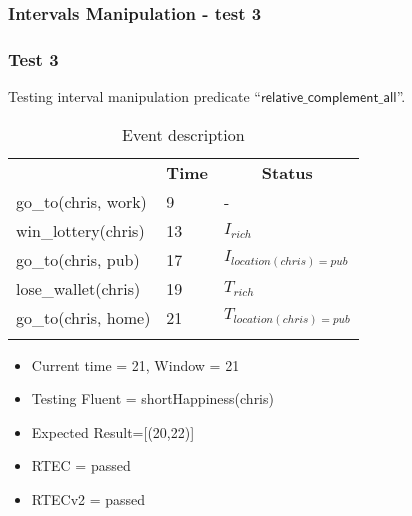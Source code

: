 \documentclass[8pt]{beamer}
\def \patsize {}
\def\complementall{\textsf{\patsize relative\_complement\_all}}
\begin{document}
\begin{frame}
    \frametitle{Intervals Manipulation - test 3}
    \subsubsection{Test 3}
    \small Testing interval manipulation predicate ``$\complementall$''.\linebreak
    \begin{minipage}{0.48\linewidth}
        \begin{table}[t!]
            \caption{Event description}
            \begin{center}

                \begin{tabular}{lll}
                    \hline\noalign{\smallskip}
                    \multicolumn{1}{l}{\textbf{Event}} & \multicolumn{1}{c}{\textbf{Time}} & \multicolumn{1}{c}{\textbf{Status}}   \\
                    go\_to(chris, work)& 9 & -\\
                    win\_lottery(chris)& 13 & $I_{rich}$\\
                    go\_to(chris, pub)& 17 & $I_{location(chris)=pub}$\\
                    lose\_wallet(chris)& 19 & $T_{rich}$ \\
                    go\_to(chris, home)& 21 & $T_{location(chris)=pub}$\\
                    \noalign{\smallskip}
                    \hline
                \end{tabular}
            \end{center}
        \end{table}

        \begin{itemize}
            \item Current time = 21, Window = 21
            \item Testing Fluent = shortHappiness(chris)
            \item Expected Result=[(20,22)]
            \item RTEC = passed
            \item RTECv2 = passed
        \end{itemize}
    \end{minipage}
    \begin{minipage}{0.48\linewidth}


\end{minipage}
\end{frame}
\end{document}
